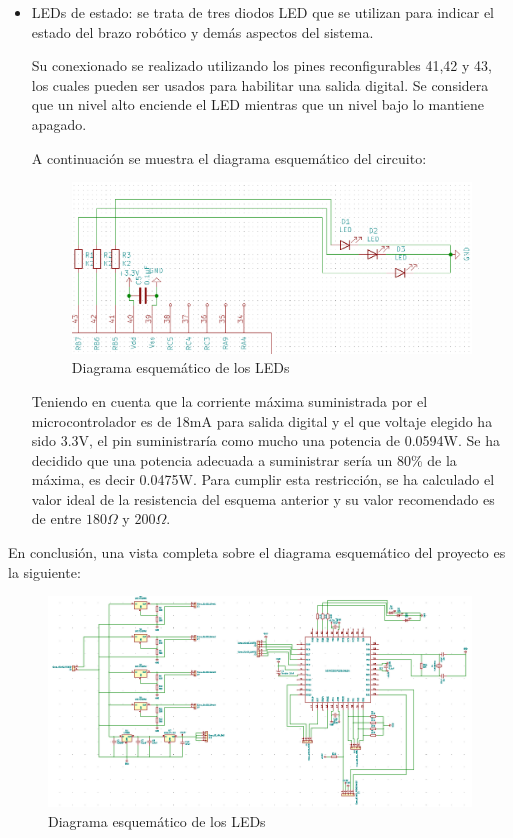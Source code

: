 \begin{itemize}
    
    \item LEDs de estado: se trata de tres diodos LED que se utilizan para indicar el estado del brazo robótico y demás aspectos del sistema. 
    
    Su conexionado se realizado utilizando los pines reconfigurables 41,42 y 43, los cuales pueden ser usados para habilitar una salida digital. Se considera que un nivel alto enciende el LED mientras que un nivel bajo lo mantiene apagado.
    
    A continuación se muestra el diagrama esquemático del circuito:
    
    \begin{figure}[H]
    \centering 
    \includegraphics[width=.75\linewidth]{pictures/LEDS.PNG}
    \caption{Diagrama esquemático de los LEDs}
    \label{fig:kdiagram}
    \end{figure}

    Teniendo en cuenta que la corriente máxima suministrada  por el microcontrolador es de 18mA para salida digital y el que voltaje elegido ha sido 3.3V, el pin suministraría como mucho una potencia de 0.0594W. Se ha decidido que una potencia adecuada a suministrar sería un 80\% de la máxima, es decir 0.0475W. Para cumplir esta restricción, se ha calculado el valor ideal de la resistencia del esquema anterior y su valor recomendado es de entre $180 \Omega$ y $200 \Omega$.
    
\end{itemize}

En conclusión, una vista completa sobre el diagrama esquemático del proyecto es la siguiente:

    \begin{figure}[H]
    \centering 
    \includegraphics[width=\linewidth]{pictures/EsquematicoCompleto.PNG}
    \caption{Diagrama esquemático de los LEDs}
    \label{fig:kdiagram}
    \end{figure}


